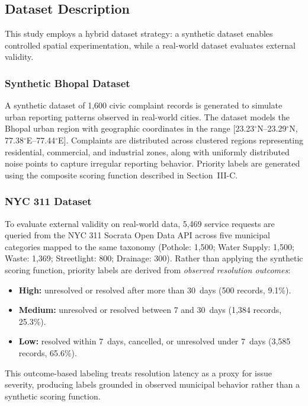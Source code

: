 \documentclass[12pt,onecolumn,draftclsnofoot]{IEEEtran}
\begin{document}
\subsection{Dataset Description}

This study employs a hybrid dataset strategy: a synthetic dataset enables controlled spatial experimentation, while a real-world dataset evaluates external validity.

\subsubsection{Synthetic Bhopal Dataset}

A synthetic dataset of 1,600 civic complaint records is generated to simulate urban reporting patterns observed in real-world cities. The dataset models the Bhopal urban region with geographic coordinates in the range [23.23$^{\circ}$N--23.29$^{\circ}$N, 77.38$^{\circ}$E--77.44$^{\circ}$E]. Complaints are distributed across clustered regions representing residential, commercial, and industrial zones, along with uniformly distributed noise points to capture irregular reporting behavior. Priority labels are generated using the composite scoring function described in Section~III-C.

\subsubsection{NYC 311 Dataset}

To evaluate external validity on real-world data, 5,469 service requests are queried from the NYC 311 Socrata Open Data API across five municipal categories mapped to the same taxonomy (Pothole: 1,500; Water Supply: 1,500; Waste: 1,369; Streetlight: 800; Drainage: 300). Rather than applying the synthetic scoring function, priority labels are derived from \textit{observed resolution outcomes}:

\begin{itemize}
    \item \textbf{High:} unresolved or resolved after more than 30~days (500 records, 9.1\%).
    \item \textbf{Medium:} unresolved or resolved between 7 and 30~days (1,384 records, 25.3\%).
    \item \textbf{Low:} resolved within 7~days, cancelled, or unresolved under 7~days (3,585 records, 65.6\%).
\end{itemize}

This outcome-based labeling treats resolution latency as a proxy for issue severity, producing labels grounded in observed municipal behavior rather than a synthetic scoring function.
\end{document}
